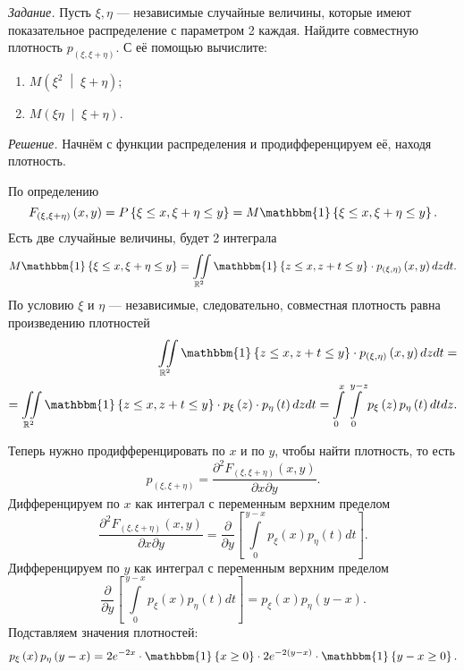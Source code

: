 \textit{Задание.}
Пусть $ \xi, \eta $ --- независимые случайные величины,
которые имеют показательное распределение с параметром 2 каждая.
Найдите совместную плотность $p_{ \left( \xi, \xi + \eta \right) }$.
С её помощью вычислите:
\begin{enumerate}[label=\alph*)]
  \item $M \left( \xi^2 \; \middle| \; \xi + \eta \right) $;
  \item $M \left( \xi \eta \; \middle| \; \xi + \eta \right) $.
\end{enumerate}

\textit{Решение.} Начнём с функции распределения и продифференцируем её, находя плотность.

По определению
$$F_{ \left( \xi, \xi + \eta \right) } \left( x, y \right) =
  P \left\{ \xi \leq x, \xi + \eta \leq y \right\} =
  M \mathbbm{1} \left\{ \xi \leq x, \xi + \eta \leq y \right\}.$$
Есть две случайные величины, будет 2 интеграла
$$M \mathbbm{1} \left\{ \xi \leq x, \xi + \eta \leq y \right\} =
  \iint \limits_{ \mathbb{R}^2}
    \mathbbm{1} \left\{ z \leq x, z + t \leq y \right\} \cdot
    p_{ \left( \xi, \eta \right) } \left( x, y \right)
  dzdt.$$
По условию $ \xi $ и $ \eta $ --- независимые, следовательно,
совместная плотность равна произведению плотностей
\begin{equation*}
  \begin{split}
    \iint \limits_{ \mathbb{R}^2}
      \mathbbm{1} \left\{ z \leq x, z + t \leq y \right\} \cdot
      p_{ \left( \xi, \eta \right) } \left( x, y \right)
    dzdt = \\
    = \iint \limits_{ \mathbb{R}^2}
      \mathbbm{1} \left\{ z \leq x, z + t \leq y \right\} \cdot
      p_{ \xi } \left( z \right) \cdot p_{ \eta } \left( t \right)
    dzdt =
    \int \limits_0^x
      \int \limits_0^{y - z} p_{ \xi } \left( z \right) p_{ \eta } \left( t \right) dt
    dz.
  \end{split}
\end{equation*}

Теперь нужно продифференцировать по $x$ и по $y$, чтобы найти плотность, то есть
$$p_{ \left( \xi, \xi + \eta \right) } =
  \frac{ \partial^2 F_{ \left( \xi, \xi + \eta \right) } \left( x, y \right) }{ \partial x \partial y}.$$
Дифференцируем по $x$ как интеграл с переменным верхним пределом
$$ \frac{ \partial^2 F_{ \left( \xi, \xi + \eta \right) } \left( x, y \right) }{ \partial x \partial y} =
  \frac{ \partial }{ \partial y}
    \left[
      \int \limits_0^{y - x} p_{ \xi } \left( x \right) p_{ \eta } \left( t \right) dt
    \right].$$
Дифференцируем по $y$ как интеграл с переменным верхним пределом
$$ \frac{ \partial }{ \partial y}
    \left[
      \int \limits_0^{y - x} p_{ \xi } \left( x \right) p_{ \eta } \left( t \right) dt
    \right] =
  p_{ \xi } \left( x \right) p_{ \eta } \left( y - x \right).$$
Подставляем значения плотностей:
$$p_{ \xi } \left( x \right) p_{ \eta } \left( y - x \right) =
  2e^{-2x} \cdot \mathbbm{1} \left\{ x \geq 0 \right\} \cdot
  2e^{-2 \left( y - x \right) } \cdot \mathbbm{1} \left\{ y - x \geq 0 \right\}.$$

